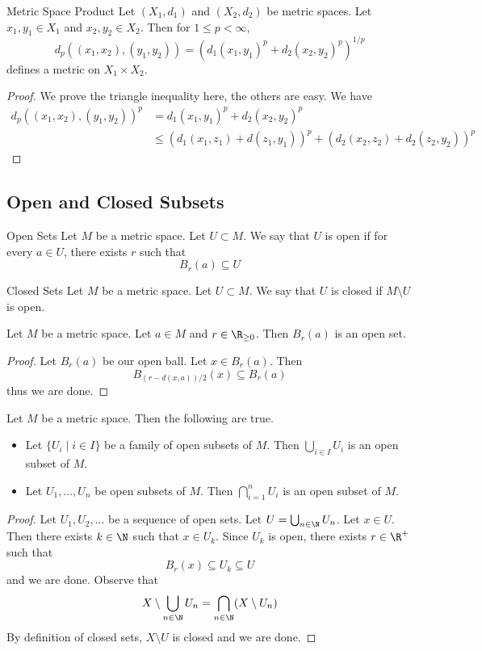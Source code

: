 \documentclass[a4paper]{article}
\begin{document}
\begin{prp}{Metric Space Product}{} Let $(X_1,d_1)$ and $(X_2,d_2)$ be metric spaces. Let $x_1,y_1\in X_1$ and $x_2,y_2\in X_2$. Then for $1\leq p<\infty$, $$d_p((x_1,x_2),(y_1,y_2))=(d_1(x_1,y_1)^p+d_2(x_2,y_2)^p)^{1/p}$$ defines a metric on $X_1\times X_2$. \tcbline
\begin{proof}
We prove the triangle inequality here, the others are easy. We have
\begin{align*}
d_p((x_1,x_2),(y_1,y_2))^p&=d_1(x_1,y_1)^p+d_2(x_2,y_2)^p\\
&\leq(d_1(x_1,z_1)+d(z_1,y_1))^p+(d_2(x_2,z_2)+d_2(z_2,y_2))^p
\end{align*}
\end{proof}
\end{prp}

\subsection{Open and Closed Subsets}
\begin{defn}{Open Sets}{} Let $M$ be a metric space. Let $U\subset M$. We say that $U$ is open if for every $a\in U$, there exists $r$ such that $$B_r(a)\subseteq U$$
\end{defn}

\begin{defn}{Closed Sets}{} Let $M$ be a metric space. Let $U\subset M$. We say that $U$ is closed if $M\setminus U$ is open. 
\end{defn}

\begin{lmm}{}{} Let $M$ be a metric space. Let $a\in M$ and $r\in\R_{\geq 0}$. Then $B_r(a)$ is an open set. \tcbline
\begin{proof} Let $B_r(a)$ be our open ball. Let $x\in B_r(a)$. Then $$B_{(r-d(x,a))/2}(x)\subseteq B_r(a)$$ thus we are done. 
\end{proof}
\end{lmm}

\begin{prp}{}{} Let $M$ be a metric space. Then the following are true. 
\begin{itemize}
\item Let $\{U_i\;|\;i\in I\}$ be a family of open subsets of $M$. Then $\bigcup_{i\in I}U_i$ is an open subset of $M$. 
\item Let $U_1,\dots,U_n$ be open subsets of $M$. Then $\bigcap_{i=1}^nU_i$ is an open subset of $M$. 
\end{itemize} \tcbline
\begin{proof} Let $U_1,U_2,\dots$ be a sequence of open sets. Let $U=\bigcup_{n\in\N}U_n$. Let $x\in U$. Then there exists $k\in\N$ such that $x\in U_k$. Since $U_k$ is open, there exists $r\in\R^+$ such that $$B_r(x)\subseteq U_k\subseteq U$$ and we are done. \linebreak\linebreak
Observe that $$X\setminus\bigcup_{n\in\N}U_n=\bigcap_{n\in\N}(X\setminus U_n)$$ By definition of closed sets, $X\setminus U$ is closed and we are done. 
\end{proof}
\end{prp}
\end{document}
